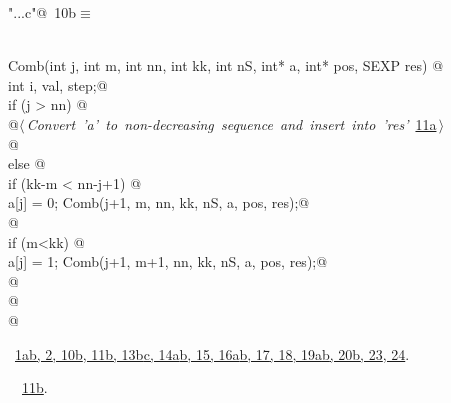\documentclass[reqno]{amsart}
\renewcommand{\NWtarget}[2]{\hypertarget{#1}{#2}}
\renewcommand{\NWlink}[2]{\hyperlink{#1}{#2}}
\begin{document}
\begin{flushleft} \small\label{scrap12}\raggedright\small
\NWtarget{nuweb10b}{} \verb@"..\src\ReprodCalcs.c"@\nobreak\ {\footnotesize {10b}}$\equiv$
\vspace{-1ex}
\begin{list}{}{} \item
\mbox{}\verb@@\\
\mbox{}\verb@void Comb(int j, int m, int nn, int kk, int nS, int* a, int* pos, SEXP res) {@\\
\mbox{}\verb@        int i, val, step;@\\
\mbox{}\verb@        if (j > nn) {  @\\
\mbox{}\verb@        @\hbox{$\langle\,${\itshape Convert 'a' to non-decreasing sequence and insert into 'res'}\nobreak\ {\footnotesize \NWlink{nuweb11a}{11a}}$\,\rangle$}\verb@@\\
\mbox{}\verb@    }           @\\
\mbox{}\verb@        else {@\\
\mbox{}\verb@                if (kk-m < nn-j+1) {@\\
\mbox{}\verb@                        a[j] = 0; Comb(j+1, m, nn, kk, nS, a, pos, res);@\\
\mbox{}\verb@                }@\\
\mbox{}\verb@                if (m<kk) {@\\
\mbox{}\verb@                        a[j] = 1; Comb(j+1, m+1, nn, kk, nS, a, pos, res);@\\
\mbox{}\verb@                }@\\
\mbox{}\verb@        }@\\
\mbox{}\verb@}@\\
\mbox{}\verb@@{\NWsep}
\end{list}
\vspace{-1.5ex}
\footnotesize
\begin{list}{}{\setlength{\itemsep}{-\parsep}\setlength{\itemindent}{-\leftmargin}}
\item \NWtxtFileDefBy\ \NWlink{nuweb1a}{1a}\NWlink{nuweb1b}{b}\NWlink{nuweb2}{, 2}\NWlink{nuweb10b}{, 10b}\NWlink{nuweb11b}{, 11b}\NWlink{nuweb13b}{, 13b}\NWlink{nuweb13c}{c}\NWlink{nuweb14a}{, 14a}\NWlink{nuweb14b}{b}\NWlink{nuweb15}{, 15}\NWlink{nuweb16a}{, 16a}\NWlink{nuweb16b}{b}\NWlink{nuweb17}{, 17}\NWlink{nuweb18}{, 18}\NWlink{nuweb19a}{, 19a}\NWlink{nuweb19b}{b}\NWlink{nuweb20b}{, 20b}\NWlink{nuweb23}{, 23}\NWlink{nuweb24}{, 24}.
\item \NWtxtIdentsDefed\nobreak\  \verb@Comb@\nobreak\ \NWlink{nuweb11b}{11b}.
\item{}
\end{list}
\vspace{4ex}
\end{flushleft}
\end{document}
